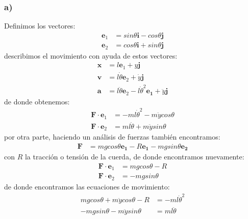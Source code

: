 \documentclass{article}
\begin{document}
\begin{tcolorbox}[breakable]
    \subsubsection*{a)}
    Definimos los vectores:
    \begin{align*}
        \bm{e}_1 &= sin\theta \bm{i} - cos\theta \bm{j} \\ 
        \bm{e}_2 &= cos\theta \bm{i} + sin\theta \bm{j}
    \end{align*}
    describimos el movimiento con ayuda de estos vectores:
    \begin{align*}
        \bm{x} &= l\bm{e}_1 + y\bm{j} \\
        \bm{v} &= l\dot{\theta}\bm{e}_2 + \dot{y}\bm{j} \\
        \bm{a} &= l\ddot{\theta}\bm{e}_2 - l\dot{\theta}^2\bm{e_1} + \ddot{y}\bm{j}
    \end{align*}
    de donde obtenemos:
    \begin{align*}
        \bm{F} \cdot \bm{e}_1 &= -ml\dot{\theta}^2 - m\ddot{y} cos\theta \\
        \bm{F} \cdot \bm{e}_2 &= ml\ddot{\theta} + m\ddot{y}sin\theta
    \end{align*}
    por otra parte, haciendo un análisis de fuerzas también encontramos:
    \begin{align*}
        \bm{F} &= mgcos\theta \bm{e_1} - R\bm{e_1} - mgsin\theta \bm{e_2}
    \end{align*}
    con $R$ la tracción o tensión de la cuerda, de donde encontramos nuevamente:
    \begin{align*}
        \bm{F} \cdot \bm{e}_1 &= mgcos\theta - R \\
        \bm{F} \cdot \bm{e}_2 &= -mgsin\theta 
    \end{align*}
    de donde encontramos las ecuaciones de movimiento:
    \begin{align*}
        mgcos\theta + m\ddot{y}cos\theta - R &= -ml\dot{\theta}^2 \\
        -mgsin\theta - m\ddot{y}sin\theta &= ml\ddot{\theta}
    \end{align*}

\end{tcolorbox}
\end{document}
